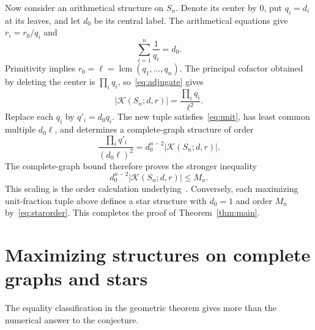 \documentclass[11pt]{article}
\theoremstyle{remark}
\DeclareMathOperator{\lcm}{lcm}
\newcommand{\K}{\mathcal K}
\begin{document}
Now consider an arithmetical structure on $S_n$. Denote its center by $0$, put $q_i=d_i$ at its leaves, and let $d_0$ be its central label. The arithmetical equations give $r_i=r_0/q_i$ and
\[
 \sum_{i=1}^n\frac1{q_i}=d_0.
\]
Primitivity implies $r_0=\ell=\lcm(q_1,\ldots,q_n)$. The principal cofactor obtained by deleting the center is $\prod_iq_i$, so~\eqref{eq:adjugate} gives
\begin{equation}\label{eq:starorder}
 |\K(S_n;d,r)|=\frac{\prod_iq_i}{\ell^2}.
\end{equation}
Replace each $q_i$ by $q'_i=d_0q_i$. The new tuple satisfies~\eqref{eq:unit}, has least common multiple $d_0\ell$, and determines a complete-graph structure of order
\[
 \frac{\prod_i q'_i}{(d_0\ell)^2}
 =d_0^{n-2}|\K(S_n;d,r)|.
\]
The complete-graph bound therefore proves the stronger inequality
\begin{equation}\label{eq:center}
 d_0^{n-2}|\K(S_n;d,r)|\leq M_n.
\end{equation}
This scaling is the order calculation underlying~\cite[Proposition~20]{ADGL}. Conversely, each maximizing unit-fraction tuple above defines a star structure with $d_0=1$ and order $M_n$ by~\eqref{eq:starorder}. This completes the proof of Theorem~\ref{thm:main}.

\section{Maximizing structures on complete graphs and stars}

The equality classification in the geometric theorem gives more than the numerical answer to the conjecture.
\end{document}
